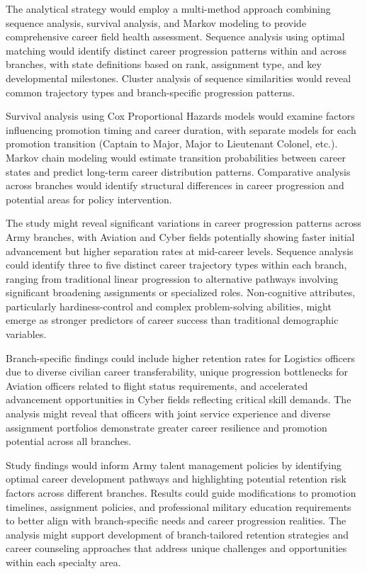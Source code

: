 \documentclass[main.tex]{subfiles}
\begin{document}

The analytical strategy would employ a multi-method approach combining sequence analysis, survival analysis, and Markov modeling to provide comprehensive career field health assessment. Sequence analysis using optimal matching would identify distinct career progression patterns within and across branches, with state definitions based on rank, assignment type, and key developmental milestones. Cluster analysis of sequence similarities would reveal common trajectory types and branch-specific progression patterns.

Survival analysis using Cox Proportional Hazards models would examine factors influencing promotion timing and career duration, with separate models for each promotion transition (Captain to Major, Major to Lieutenant Colonel, etc.). Markov chain modeling would estimate transition probabilities between career states and predict long-term career distribution patterns. Comparative analysis across branches would identify structural differences in career progression and potential areas for policy intervention.


The study might reveal significant variations in career progression patterns across Army branches, with Aviation and Cyber fields potentially showing faster initial advancement but higher separation rates at mid-career levels. Sequence analysis could identify three to five distinct career trajectory types within each branch, ranging from traditional linear progression to alternative pathways involving significant broadening assignments or specialized roles. Non-cognitive attributes, particularly hardiness-control and complex problem-solving abilities, might emerge as stronger predictors of career success than traditional demographic variables.

Branch-specific findings could include higher retention rates for Logistics officers due to diverse civilian career transferability, unique progression bottlenecks for Aviation officers related to flight status requirements, and accelerated advancement opportunities in Cyber fields reflecting critical skill demands. The analysis might reveal that officers with joint service experience and diverse assignment portfolios demonstrate greater career resilience and promotion potential across all branches.


Study findings would inform Army talent management policies by identifying optimal career development pathways and highlighting potential retention risk factors across different branches. Results could guide modifications to promotion timelines, assignment policies, and professional military education requirements to better align with branch-specific needs and career progression realities. The analysis might support development of branch-tailored retention strategies and career counseling approaches that address unique challenges and opportunities within each specialty area.
\end{document}

